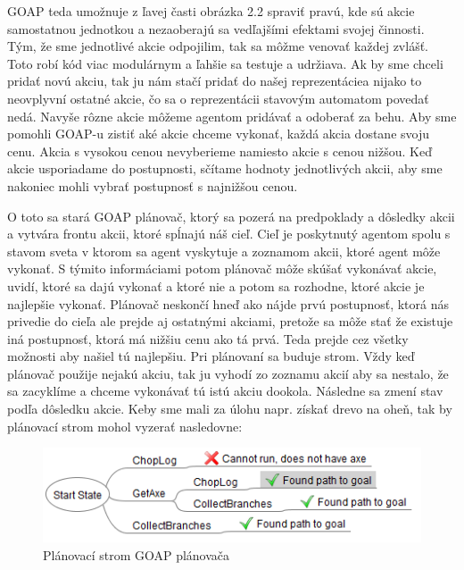 GOAP teda umožnuje z ľavej časti obrázka 2.2 spraviť pravú, kde sú akcie samostatnou jednotkou a nezaoberajú sa vedľajšími efektami svojej činnosti. Tým, že sme jednotlivé akcie odpojilim, tak sa môžme venovať každej zvlášť. Toto robí kód viac modulárnym a ľahšie sa testuje a udržiava. Ak by sme chceli pridať novú akciu, tak ju nám stačí pridať do našej reprezentáciea nijako to neovplyvní ostatné akcie, čo sa o reprezentácii stavovým automatom povedať nedá. Navyše rôzne akcie môžeme agentom pridávať a odoberať za behu. Aby sme pomohli GOAP-u zistiť aké akcie chceme vykonať, každá akcia dostane svoju cenu. Akcia s vysokou cenou nevyberieme namiesto akcie s cenou nižšou. Keď akcie usporiadame do postupnosti, sčítame hodnoty jednotlivých akcii, aby sme nakoniec mohli vybrať postupnosť s najnižšou cenou.\par
O toto sa stará GOAP plánovač, ktorý sa pozerá na predpoklady a dôsledky akcii a vytvára frontu akcii, ktoré spĺnajú náš cieľ. Cieľ je poskytnutý agentom spolu s stavom sveta v ktorom sa agent vyskytuje a zoznamom akcii, ktoré agent môže vykonať. S týmito informáciami potom plánovač môže skúšať vykonávať akcie, uvidí, ktoré sa dajú vykonať a ktoré nie a potom sa rozhodne, ktoré akcie je najlepšie vykonať. Plánovač neskončí hneď ako nájde prvú postupnosť, ktorá nás privedie do cieľa ale prejde aj ostatnými akciami, pretože sa môže stať že existuje iná postupnosť, ktorá má nižšiu cenu ako tá prvá. Teda prejde cez všetky možnosti aby našiel tú najlepšiu. Pri plánovaní sa buduje strom. Vždy keď plánovač použije nejakú akciu, tak ju vyhodí zo zoznamu akcií aby sa nestalo, že sa zacyklíme a chceme vykonávať tú istú akciu dookola. Následne sa zmení stav podľa dôsledku akcie. Keby sme mali za úlohu napr. získať drevo na oheň, tak by plánovací strom mohol vyzerať nasledovne:
\begin{figure}[H] 
\begin{center}
\includegraphics[scale=1.0]{img/plan_tree.png}
\caption{Plánovací strom GOAP plánovača \cite{goap}}
\label{fig:ch23}
\end{center}
\end{figure}
